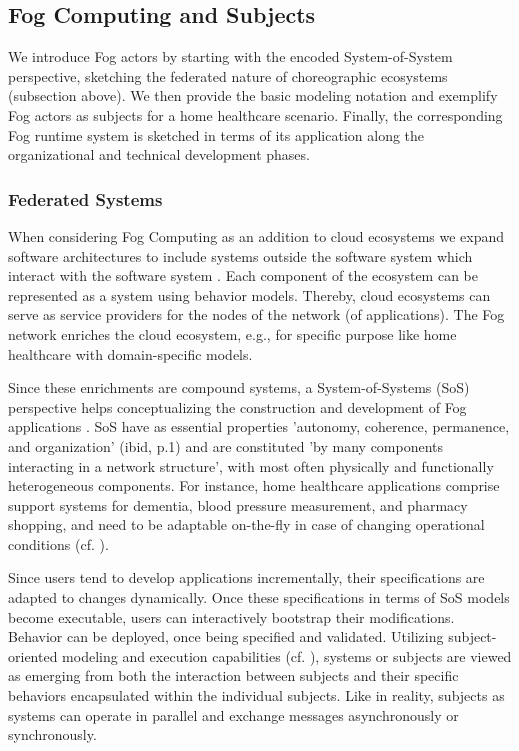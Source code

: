 \subsection{Fog Computing and Subjects}

We introduce Fog actors by starting with the encoded System-of-System perspective, sketching the federated nature of choreographic ecosystems (subsection above). We then provide the basic modeling notation and exemplify Fog actors as subjects for a home healthcare scenario. Finally, the corresponding Fog runtime system is sketched in terms of its application along the organizational and technical development phases.

\subsubsection{Federated Systems}
When considering Fog Computing as an addition to cloud ecosystems we expand software architectures to include systems outside the software system which interact with the software system \cite{article:FogPattern}. Each component of the ecosystem can be represented as a system using behavior models. Thereby, cloud ecosystems can serve as service providers for the nodes of the network (of applications). The Fog network enriches the cloud ecosystem, e.g., for specific purpose like home healthcare with domain-specific models.\

Since these enrichments are compound systems, a System-of-Systems (SoS) perspective helps conceptualizing the construction and development of Fog applications \cite{article:SyS}. SoS have as essential properties 'autonomy, coherence, permanence, and organization' (ibid, p.1) and are constituted 'by many components interacting in a network structure', with most often physically and functionally heterogeneous components. For instance, home healthcare applications comprise support systems for dementia, blood pressure measurement, and pharmacy shopping, and need to be adaptable on-the-fly in case of changing operational conditions (cf. \cite{article:DesignHealth}).\

Since users tend to develop applications incrementally, their specifications are adapted to changes dynamically. Once these specifications in terms of SoS models become executable, users can interactively bootstrap their modifications. Behavior can be deployed, once being specified and validated. Utilizing subject-oriented modeling and execution capabilities (cf. \cite{Flei12}), systems or subjects are viewed as emerging from both the interaction between subjects and their specific behaviors encapsulated within the individual subjects. Like in reality, subjects as systems can operate in parallel and exchange messages asynchronously or synchronously.


